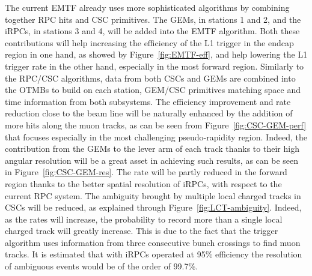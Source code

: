 	The current EMTF already uses more sophisticated algorithms by combining together RPC hits and CSC primitives. The GEMs, in stations 1 and 2, and the iRPCs, in stations 3 and 4, will be added into the EMTF algorithm. Both these contributions will help increasing the efficiency of the L1 trigger in the endcap region in one hand, as showed by Figure~\ref{fig:EMTF-eff}, and help lowering the L1 trigger rate in the other hand, especially in the most forward region. Similarly to the RPC/CSC algorithms, data from both CSCs and GEMs are combined into the \acf{OTMBs} to build on each station, GEM/CSC primitives matching space and time information from both subsystems. The efficiency improvement and rate reduction close to the beam line will be naturally enhanced by the addition of more hits along the muon tracks, as can be seen from Figure~\ref{fig:CSC-GEM-perf} that focuses especially in the most challenging pseudo-rapidity region. Indeed, the contribution from the GEMs to the lever arm of each track thanks to their high angular resolution will be a great asset in achieving such results, as can be seen in Figure~\ref{fig:CSC-GEM-res}. The rate will be partly reduced in the forward region thanks to the better spatial resolution of iRPCs, with respect to the current RPC system. The ambiguity brought by multiple local charged tracks in CSCs will be reduced, as explained through Figure~\ref{fig:LCT-ambiguity}. Indeed, as the rates will increase, the probability to record more than a single local charged track will greatly increase. This is due to the fact that the trigger algorithm uses information from three consecutive bunch crossings to find muon tracks. It is estimated that with iRPCs operated at 95\% efficiency the resolution of ambiguous events would be of the order of 99.7\%.
	
